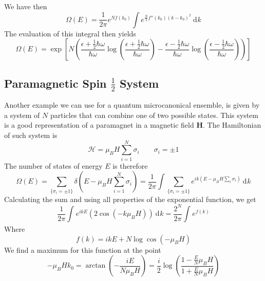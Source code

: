 \documentclass[a4paper, 11pt]{book}
\renewcommand{\vec}[1]{\mathbf{#1}}
\newcommand{\1}{\opr{\mathds{1}}}
\newcommand{\diff}[2][]{\ \mathrm{d}^{#1}#2}
\newcommand{\ham}{\mathcal{H}}
\newcommand{\opr}[1]{\hat{#1}}
\theoremstyle{plain}
\begin{document}
		We have then
		\begin{equation}
			\Omega(E)=\frac{1}{2\pi}e^{Nf(k_0)}\int e^{\frac{N}{2}f''(k_0)(k-k_0)^2}\diff{k}
			\label{eq:Omegaesaddlepointmethod}
		\end{equation}
		The evaluation of this integral then yields
		\begin{equation}
			\Omega(E)=\exp\left[ N\left( \frac{\epsilon+\frac{1}{2}\hbar\omega}{\hbar\omega}\log\left( \frac{\epsilon+\frac{1}{2}\hbar\omega}{\hbar\omega} \right)-\frac{\epsilon-\frac{1}{2}\hbar\omega}{\hbar\omega}\log\left( \frac{\epsilon-\frac{1}{2}\hbar\omega}{\hbar\omega} \right) \right) \right]
			\label{eq:omegaenqhocomplete}
		\end{equation}
		\subsection{Paramagnetic Spin $\frac{1}{2}$ System}
		Another example we can use for a quantum microcanonical ensemble, is given by a system of $N$ particles that can combine one of two possible states. This system is a good representation of a paramagnet in a magnetic field $\vec{H}$. The Hamiltonian of such system is
		\begin{equation}
			\opr{\ham}=\mu_BH\sum_{i=1}^N\sigma_i\qquad\sigma_i=\pm1
			\label{eq:paramagnethamiltonian}
		\end{equation}
		The number of states of energy $E$ is therefore
		\begin{equation}
			\Omega(E)=\sum_{\{\sigma_i=\pm1\}}\delta\left( E-\mu_BH\sum_{i=1}^N\sigma_i \right)=\frac{1}{2\pi}\int\sum_{\{\sigma_i=\pm1\}}e^{ik\left( E-\mu_BH\sum_{i}\sigma_i \right)}\diff{k}
			\label{eq:deltatransformparamagnet}
		\end{equation}
		Calculating the sum and using all properties of the exponential function, we get
		\begin{equation}
			\frac{1}{2\pi}\int_{}^{}e^{ikE}\left( 2\cos\left( -k\mu_BH \right) \right)\diff{k}=\frac{2^N}{2\pi}\int_{}^{}e^{f(k)}
			\label{eq:saddlepointutilization}
		\end{equation}
		Where
		\begin{equation*}
			f(k)=ikE+N\log\cos(-\mu_BH)
		\end{equation*}
		We find a maximum for this function at the point
		\begin{equation}
			-\mu_BHk_0=\arctan\left( -\frac{iE}{N\mu_BH} \right)=\frac{i}{2}\log\left( \frac{1-\frac{E}{N}\mu_BH}{1+\frac{E}{N}\mu_BH} \right)
			\label{eq:maximumsaddlepointparamagnet}
		\end{equation}
\end{document}
